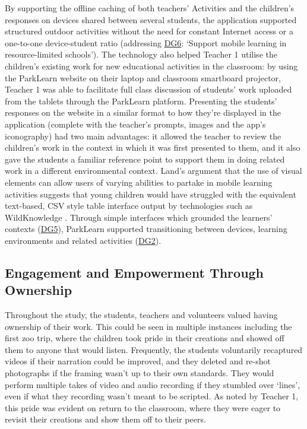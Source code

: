 By supporting the offline caching of both teachers’ Activities and the children’s responses on devices shared between several students, the application supported structured outdoor activities without the need for constant Internet access or a one-to-one device-student ratio (addressing \hyperref[DG6]{DG6}: `Support mobile learning in resource-limited schools'). The technology also helped Teacher 1 utilise the children’s existing work for new educational activities in the classroom: by using the ParkLearn website on their laptop and classroom smartboard projector, Teacher 1 was able to facilitate full class discussion of students’ work uploaded from the tablets through the ParkLearn platform. Presenting the students’ responses on the website in a similar format to how they’re displayed in the application (complete with the teacher’s prompts, images and the app’s iconography) had two main advantages: it allowed the teacher to review the children’s work in the context in which it was first presented to them, and it also gave the students a familiar reference point to support them in doing related work in a different environmental context. Land’s argument that the use of visual elements can allow users of varying abilities to partake in mobile learning activities \citep{Land2015} suggests that young children would have struggled with the equivalent text-based, CSV style table interface output by technologies such as WildKnowledge \citep{WildKnowledge2015}. Through simple interfaces which grounded the learners' contexts (\hyperref[DG5]{DG5}), ParkLearn supported transitioning between devices, learning environments and related activities (\hyperref[DG2]{DG2}). 

\subsection{Engagement and Empowerment Through Ownership} 

Throughout the study, the students, teachers and volunteers valued having ownership of their work. This could be seen in multiple instances including the first zoo trip, where the children took pride in their creations and showed off them to anyone that would listen. Frequently, the students voluntarily recaptured videos if their narration could be improved, and they deleted and re-shot photographs if the framing wasn't up to their own standards. They would perform multiple takes of video and audio recording if they stumbled over `lines', even if what they recording wasn't meant to be scripted. As noted by Teacher 1, this pride was evident on return to the classroom, where they were eager to revisit their creations and show them off to their peers. 

